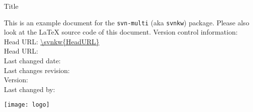 \documentclass[12pt]{report}
\begin{document}
\begin{titlepage}
 \vspace{8ex}
 {\huge Title\par}
 \vspace{2ex}
 {\large \noindent This is an example document for the \texttt{svn-multi} (aka
 \texttt{svnkw}) package. Please also look at the LaTeX source code of this
 document.}
 \vfill
 \flushleft\sffamily
 Version control information:\\
 Head URL: \url{\svnkw{HeadURL}}\\
 Head URL: \\
 Last changed date: \svndate\\
 Last changes revision: \svnrev\\
 Version: \svnFullRevision*{\svnrev}\\
 Last changed by: \svnFullAuthor*{\svnauthor}\\
\end{titlepage}

\tableofcontents


%
%



\makeatletter

\makeatother
\texttt{[image: logo]}
\end{document}
